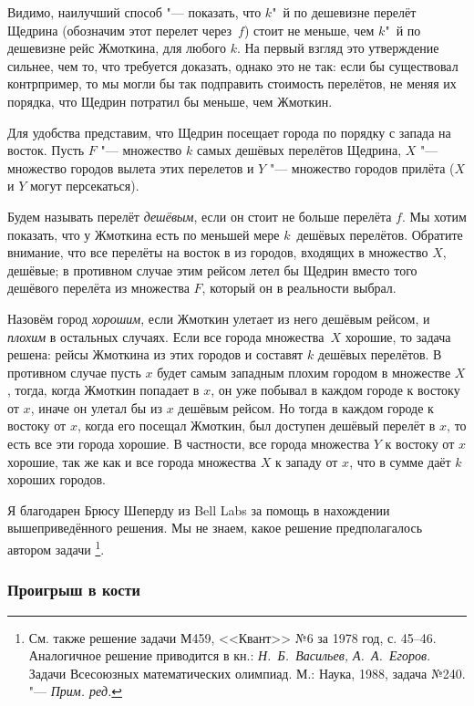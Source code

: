 \documentclass[twoside]{book}
\newcommand\VsMO{\emph{Н.~Б.~Васильев, А.~А.~Егоров}. Задачи Всесоюзных математических олимпиад. М.: Наука, 1988}
\begin{document}
\medskip

Видимо, наилучший способ "--- показать, что $k$"~й по дешевизне
перелёт Щедрина (обозначим этот перелет через~$f$) стоит не меньше,
чем $k$"~й по дешевизне рейс Жмоткина, для любого $k$.
На первый взгляд это утверждение сильнее, чем то, что требуется доказать, однако это не так:
если бы существовал контрпример, то мы могли бы так подправить стоимость перелётов, не меняя их порядка, что Щедрин потратил бы меньше, чем Жмоткин.

Для удобства представим, что Щедрин посещает города по порядку с
запада на восток.
Пусть $F$ "--- множество $k$ самых дешёвых
перелётов Щедрина, $X$ "--- множество городов вылета этих перелетов и $Y$ "--- множество
городов прилёта  ($X$ и $Y$ могут персекаться).

Будем называть перелёт \emph{дешёвым}, если он стоит не больше перелёта $f$.
Мы хотим показать, что у Жмоткина есть по меньшей мере $k$~дешёвых перелётов.
Обратите внимание, что все перелёты на восток в из городов, входящих в
множество $X$, дешёвые; в противном случае этим рейсом летел бы Щедрин
вместо того дешёвого перелёта из множества $F$, который он в
реальности выбрал.

Назовём город \emph{хорошим}, если Жмоткин улетает из него дешёвым рейсом, и \emph{плохим} в остальных случаях.
Если все города множества~$X$ хорошие, то задача решена: рейсы Жмоткина из этих городов и составят $k$ дешёвых перелётов.
В противном случае пусть $x$ будет самым западным плохим городом в множестве $X$, тогда, когда  Жмоткин попадает в $x$, он уже побывал в каждом городе к востоку от $x$, иначе он улетал бы из $x$ дешёвым рейсом.
Но тогда в каждом городе к востоку от $x$, когда его посещал Жмоткин, был доступен дешёвый перелёт в $x$, то есть все эти города хорошие.
В частности, все города множества $Y$ к востоку от $x$ хорошие, так же как и все города множества $X$ к западу от $x$, что в сумме даёт $k$ хороших городов.
\heart

\medskip
Я благодарен Брюсу Шеперду %
из  Bell Labs 
за помощь в нахождении вышеприведённого решения.
Мы не знаем, какое решение предполагалось автором задачи%
\footnote{См. также решение задачи М459, <<Квант>> №6 за 1978 год, с. 45--46.
Аналогичное решение
приводится в
кн.: \VsMO, задача №240. "--- \emph{Прим. ред.} }.

\subsubsection*{Проигрыш в кости}%
\end{document}
